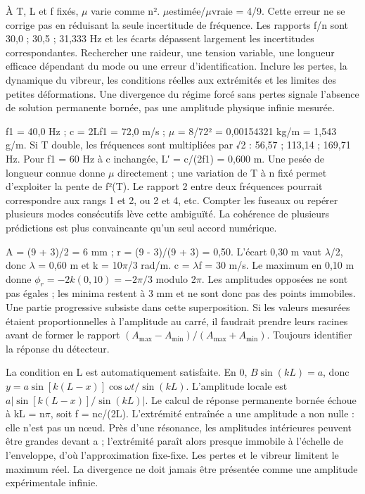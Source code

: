 À T, L et f fixés, \ensuremath{\mu} varie comme n². \ensuremath{\mu}estimée/\ensuremath{\mu}vraie = 4/9. Cette erreur ne se corrige pas en réduisant la seule incertitude de fréquence.
Les rapports f/n sont 30,0 ; 30,5 ; 31,333 Hz et les écarts dépassent largement les incertitudes correspondantes. Rechercher une raideur, une tension variable, une longueur efficace dépendant du mode ou une erreur d’identification.
Inclure les pertes, la dynamique du vibreur, les conditions réelles aux extrémités et les limites des petites déformations. Une divergence du régime forcé sans pertes signale l’absence de solution permanente bornée, pas une amplitude physique infinie mesurée.


f1 = 40,0 Hz ; c = 2Lf1 = 72,0 m/s ; \ensuremath{\mu} = 8/72² = 0,00154321 kg/m = 1,543 g/m. Si T double, les fréquences sont multipliées par √2 : 56,57 ; 113,14 ; 169,71 Hz. Pour f1 = 60 Hz à c inchangée, L′ = c/(2f1) = 0,600 m. Une pesée de longueur connue donne \ensuremath{\mu} directement ; une variation de T à n fixé permet d’exploiter la pente de f²(T). Le rapport 2 entre deux fréquences pourrait correspondre aux rangs 1 et 2, ou 2 et 4, etc. Compter les fuseaux ou repérer plusieurs modes consécutifs lève cette ambiguïté. La cohérence de plusieurs prédictions est plus convaincante qu’un seul accord numérique.

A = (9 + 3)/2 = 6 mm ; r = (9 - 3)/(9 + 3) = 0,50. L’écart 0,30 m vaut \ensuremath{\lambda}/2, donc \ensuremath{\lambda} = 0,60 m et k = 10\ensuremath{\pi}/3 rad/m. c = \ensuremath{\lambda}f = 30 m/s. Le maximum en 0,10 m donne $\phi_r=-2k(0{,}10)=-2\pi/3$ modulo 2\ensuremath{\pi}. Les amplitudes opposées ne sont pas égales ; les minima restent à 3 mm et ne sont donc pas des points immobiles. Une partie progressive subsiste dans cette superposition. Si les valeurs mesurées étaient proportionnelles à l’amplitude au carré, il faudrait prendre leurs racines avant de former le rapport $(A_{\max}-A_{\min})/(A_{\max}+A_{\min})$. Toujours identifier la réponse du détecteur.

La condition en L est automatiquement satisfaite. En 0, $B\sin(kL)=a$, donc $y=a\sin[k(L-x)]\cos\omega t/\sin(kL)$. L’amplitude locale est $a|\sin[k(L-x)]/\sin(kL)|$. Le calcul de réponse permanente bornée échoue à kL = n\ensuremath{\pi}, soit f = nc/(2L). L’extrémité entraînée a une amplitude a non nulle : elle n’est pas un nœud. Près d’une résonance, les amplitudes intérieures peuvent être grandes devant a ; l’extrémité paraît alors presque immobile à l’échelle de l’enveloppe, d’où l’approximation fixe-fixe. Les pertes et le vibreur limitent le maximum réel. La divergence ne doit jamais être présentée comme une amplitude expérimentale infinie.

